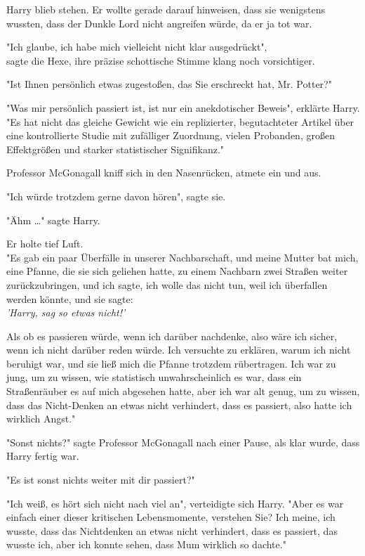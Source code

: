 {Harry blieb stehen. Er wollte gerade darauf hinweisen, dass sie wenigstens wussten, dass der Dunkle Lord nicht angreifen würde, da er ja tot war.

"Ich glaube, ich habe mich vielleicht nicht klar ausgedrückt",\\ sagte die Hexe, ihre präzise schottische Stimme klang noch vorsichtiger.

"Ist Ihnen persönlich etwas zugestoßen, das Sie erschreckt hat, Mr. Potter?"

"Was mir persönlich passiert ist, ist nur ein anekdotischer Beweis", erklärte Harry. "Es hat nicht das gleiche Gewicht wie ein replizierter, begutachteter Artikel über eine kontrollierte Studie mit zufälliger Zuordnung, vielen Probanden, großen Effektgrößen und starker statistischer Signifikanz."

Professor McGonagall kniff sich in den Nasenrücken, atmete ein und aus.

"Ich würde trotzdem gerne davon hören", sagte sie.

"Ähm …" sagte Harry.

Er holte tief Luft.\\ "Es gab ein paar Überfälle in unserer Nachbarschaft, und meine Mutter bat mich, eine Pfanne, die sie sich geliehen hatte, zu einem Nachbarn zwei Straßen weiter zurückzubringen, und ich sagte, ich wolle das nicht tun, weil ich überfallen werden könnte, und sie sagte:\\ \emph{'Harry, sag so etwas nicht!'}

Als ob es passieren würde, wenn ich darüber nachdenke, also wäre ich sicher, wenn ich nicht darüber reden würde. Ich versuchte zu erklären, warum ich nicht beruhigt war, und sie ließ mich die Pfanne trotzdem rübertragen. Ich war zu jung, um zu wissen, wie statistisch unwahrscheinlich es war, dass ein Straßenräuber es auf mich abgesehen hatte, aber ich war alt genug, um zu wissen, dass das Nicht-Denken an etwas nicht verhindert, dass es passiert, also hatte ich wirklich Angst."

"Sonst nichts?" sagte Professor McGonagall nach einer Pause, als klar wurde, dass Harry fertig war.

"Es ist sonst nichts weiter mit dir passiert?"

"Ich weiß, es hört sich nicht nach viel an", verteidigte sich Harry. "Aber es war einfach einer dieser kritischen Lebensmomente, verstehen Sie? Ich meine, ich wusste, dass das Nichtdenken an etwas nicht verhindert, dass es passiert, das wusste ich, aber ich konnte sehen, dass Mum wirklich so dachte."

}
